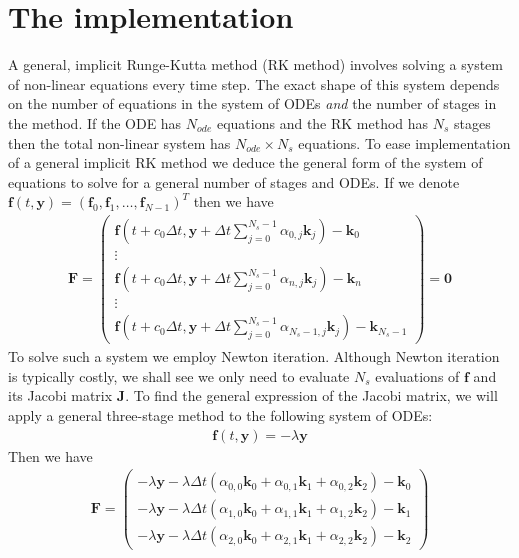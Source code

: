 \documentclass[10pt,a4paper]{article}
\newcommand{\bvec}[1]{\mathbf{#1}}
\begin{document}
\section{The implementation}
A general, implicit Runge-Kutta method (RK method) involves solving a system of non-linear equations every time step.
The exact shape of this system depends on the number of equations in the system of ODEs \emph{and} the number of stages in the method.
If the ODE has $N_{ode}$ equations and the RK method has $N_s$ stages then the total non-linear system has $N_{ode} \times N_s$ equations.
To ease implementation of a general implicit RK method we deduce the general form of the system of equations to solve for a general number of stages and ODEs.
If we denote $\bvec{f}(t,\bvec{y}) = (\bvec{f}_0, \bvec{f}_1, \hdots, \bvec{f}_{N-1})^T$ then we have
\begin{align*}
  \bvec{F} =
  \begin{pmatrix}
    \bvec{f}\left( t + c_0\Delta t, \bvec{y} + \Delta t \sum_{j=0}^{N_s-1} \alpha_{0,j} \bvec{k}_j \right) - \bvec{k}_0 \\
    \vdots \\
    \bvec{f}\left( t + c_0\Delta t, \bvec{y} + \Delta t \sum_{j=0}^{N_s-1} \alpha_{n,j} \bvec{k}_j \right) - \bvec{k}_n \\
    \vdots \\
        \bvec{f}\left( t + c_0\Delta t, \bvec{y} + \Delta t \sum_{j=0}^{N_s-1} \alpha_{N_s-1,j} \bvec{k}_j \right) - \bvec{k}_{N_s-1}
      \end{pmatrix} =
  \bvec{0}
\end{align*}
To solve such a system we employ Newton iteration.
Although Newton iteration is typically costly, we shall see we only need to evaluate $N_{s}$ evaluations of $\bvec{f}$ and its Jacobi matrix $\bvec{J}.$
To find the general expression of the Jacobi matrix, we will apply a general three-stage method to the following system of ODEs:
\begin{align*}
  \bvec{f}(t, \bvec{y}) = -\lambda \bvec{y}
\end{align*}
Then we have
\begin{align*}
  \bvec{F} = \begin{pmatrix}
    -\lambda \bvec{y} - \lambda \Delta t \left( \alpha_{0,0}\bvec{k}_0 + \alpha_{0,1}\bvec{k}_1 + \alpha_{0,2}\bvec{k}_2  \right) - \bvec{k}_0 \\
    -\lambda \bvec{y} - \lambda \Delta t \left( \alpha_{1,0}\bvec{k}_0 + \alpha_{1,1}\bvec{k}_1 + \alpha_{1,2}\bvec{k}_2  \right) - \bvec{k}_1 \\
    -\lambda \bvec{y} - \lambda \Delta t \left( \alpha_{2,0}\bvec{k}_0 + \alpha_{2,1}\bvec{k}_1 + \alpha_{2,2}\bvec{k}_2  \right) - \bvec{k}_2
\end{pmatrix}\end{align*}
\end{document}
